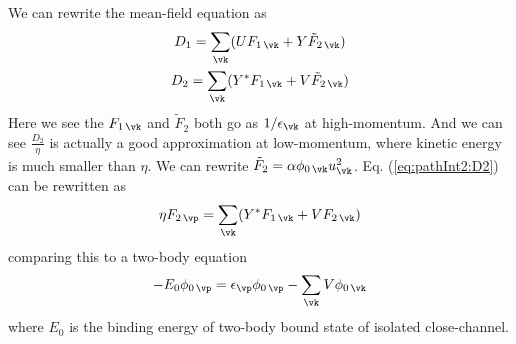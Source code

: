 We can rewrite the mean-field equation as
\begin{gather}
D_{1}=\sum_{\vk}(U F_{1\,\vk}+Y \tilde{F}_{2\,\vk})\label{eq:pathInt2:D2}\\
D_{2}=\sum_{\vk}(Y^{*} F_{1\,\vk}+V \tilde{F}_{2\,\vk})\label{eq:pathInt2:D2}
\end{gather}
Here we see the $F_{1\,\vk}$ and $\tilde{F}_{2}$  both go as $1/\epsilon_{\vk}$  at high-momentum.  %
  And we can see $\frac{D_{2}}{\eta}$ is actually a good approximation at low-momentum, where kinetic energy is much smaller than $\eta$.  We can rewrite $\tilde{F}_{2}=\alpha\phi_{0\,\vk}u_{\vk}^{2}$. Eq. (\ref{eq:pathInt2:D2}) can be rewritten as
\begin{equation*}
\eta{}F_{2\,\vp}=\sum_{\vk}(Y^{*} F_{1\,\vk}+V F_{2\,\vk})\label{eq:pathInt2:D2}
\end{equation*}
comparing this to a two-body \sch equation
\begin{equation}
-E_{0}\phi_{0\,\vp}=\epsilon_{\vp}\phi_{0\,\vp}-\sum_{\vk}V \phi_{0\,\vk}
\end{equation}
where $E_{0}$ is the binding energy of two-body bound state of isolated close-channel.   


